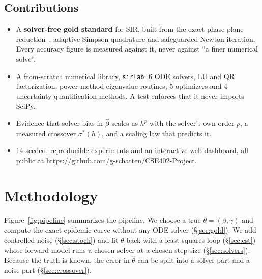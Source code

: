 \documentclass[sigconf]{acmart}
\newcommand{\repo}{\url{https://github.com/g-schatten/CSE402-Project}}
\begin{document}
\subsection{Contributions}
\begin{itemize}
  \item A \textbf{solver-free gold standard} for SIR, built from the
    exact phase-plane reduction~\cite{prodanov2021}, adaptive Simpson
    quadrature and safeguarded Newton iteration. Every accuracy figure
    is measured against it, never against ``a finer numerical solve''.
  \item A from-scratch numerical library, \texttt{sirlab}: 6 ODE
    solvers, LU and QR factorization, power-method eigenvalue routines,
    5 optimizers and 4 uncertainty-quantification methods. A test
    enforces that it never imports SciPy.
  \item Evidence that solver bias in $\hat\beta$ scales as $h^p$ with
    the solver's own order $p$, a measured crossover $\sigma^*(h)$, and
    a scaling law that predicts it.
  \item 14 seeded, reproducible experiments and an interactive web
    dashboard, all public at \repo.
\end{itemize}

\section{Methodology}
\label{sec:method}
Figure~\ref{fig:pipeline} summarizes the pipeline. We choose a true
$\theta=(\beta,\gamma)$ and compute the exact epidemic curve without any
ODE solver (\S\ref{sec:gold}). We add controlled noise (\S\ref{sec:stoch})
and fit $\theta$ back with a least-squares loop (\S\ref{sec:est}) whose
forward model runs a chosen solver at a chosen step size
(\S\ref{sec:solvers}). Because the truth is known, the error in
$\hat\theta$ can be split into a solver part and a noise part
(\S\ref{sec:crossover}).
\end{document}
